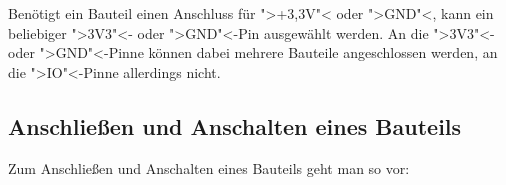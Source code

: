 \documentclass[11pt, a4paper]{article}
\begin{document}
Benötigt ein Bauteil einen Anschluss für ">+3,3V"< oder ">GND"<, kann ein beliebiger ">3V3"<- oder ">GND"<-Pin ausgewählt werden. An die ">3V3"<- oder ">GND"<-Pinne können dabei mehrere Bauteile angeschlossen werden, an die ">IO"<-Pinne allerdings nicht. 


% 

\subsection*{Anschließen und Anschalten eines Bauteils}
Zum Anschließen und Anschalten eines Bauteils geht man so vor:
\end{document}
